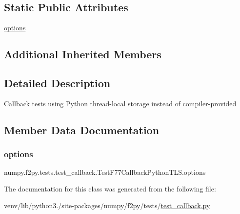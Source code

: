 \subsection*{Static Public Attributes}
\begin{DoxyCompactItemize}
\item 
\hyperlink{classnumpy_1_1f2py_1_1tests_1_1test__callback_1_1TestF77CallbackPythonTLS_a349e782ca7b6add55b7518dcdea49bd8}{options}
\end{DoxyCompactItemize}
\subsection*{Additional Inherited Members}


\subsection{Detailed Description}
\begin{DoxyVerb}Callback tests using Python thread-local storage instead of
compiler-provided
\end{DoxyVerb}
 

\subsection{Member Data Documentation}
\mbox{\label{classnumpy_1_1f2py_1_1tests_1_1test__callback_1_1TestF77CallbackPythonTLS_a349e782ca7b6add55b7518dcdea49bd8}} 
\subsubsection{\texorpdfstring{options}{options}}
{\footnotesize\ttfamily numpy.\+f2py.\+tests.\+test\+\_\+callback.\+Test\+F77\+Callback\+Python\+T\+L\+S.\+options\hspace{0.3cm}{\ttfamily [static]}}



The documentation for this class was generated from the following file\+:\begin{DoxyCompactItemize}
\item 
venv/lib/python3./site-\/packages/numpy/f2py/tests/\hyperlink{test__callback_8py}{test\+\_\+callback.\+py}\end{DoxyCompactItemize}
